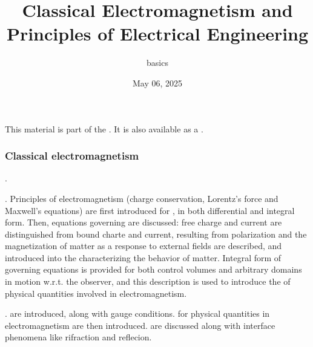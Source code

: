 \documentclass[letterpaper,10pt,english]{jupyterBook}
\title{Classical Electromagnetism and Principles of Electrical Engineering}
\date{May 06, 2025}
\author{basics}
\begin{document}
\pagestyle{empty}
\sphinxmaketitle
\pagestyle{plain}
\sphinxtableofcontents
\pagestyle{normal}
\label{\detokenize{intro::doc}}


\sphinxAtStartPar
This material is part of the . It is also available as a .
\subsubsection*{Classical electromagnetism}

\sphinxAtStartPar
{\hyperref[\detokenize{ch/experiments:classical-electromagnetism-first-experiments}]{}}. 

\sphinxAtStartPar
{\hyperref[\detokenize{ch/principles:classical-electromagnetism-principles}]{}}. Principles of electromagnetism (charge conservation, Lorentz’s force and Maxwell’s equations) are first introduced for {\hyperref[\detokenize{ch/principles-vacuum:classical-electromagnetism-principles-free-space}]{}}, in both differential and integral form. Then, equations governing {\hyperref[\detokenize{ch/principles-matter:classical-electromagnetism-principles-matter}]{}} are discussed: free charge and current are distinguished from bound charte and current, resulting from polarization and the magnetization of matter as a response to external fields are described, and introduced into the  characterizing the behavior of matter. Integral form of governing equations is provided for both control volumes and arbitrary domains in motion w.r.t. the observer, and this description is used to introduce the {\hyperref[\detokenize{ch/principles-relativity:classical-electromagnetism-principles-low-speed-relativity}]{}} of physical quantities involved in electromagnetism.

\sphinxAtStartPar
{\hyperref[\detokenize{ch/waves:classical-electromagnetism-waves}]{}}. {\hyperref[\detokenize{ch/potentials:classical-electromagnetism-potentials}]{}} are introduced, along with gauge conditions. {\hyperref[\detokenize{ch/waves-equation:classical-electromagnetism-waves-wave-equation}]{}} for physical quantities in electromagnetism are then introduced. {\hyperref[\detokenize{ch/waves-plane:classical-electromagnetism-waves-plane-waves}]{}} are discussed along with interface phenomena like rifraction and reflecion.
\end{document}
